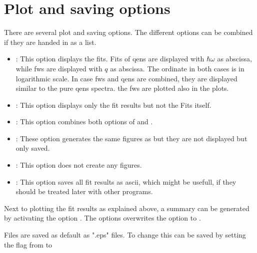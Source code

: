 \section{Plot and saving options}
There are several plot and saving options. The different options can be combined if they are handed in as a list.
\begin{itemize}
	\item {}: This option displays the fits. Fits of \Gls{qens} are displayed with $\hbar\omega$ as abscissa, while \gls{fws} are displayed with $q$ as abscissa. The ordinate in both cases is in logarithmic scale. In case \gls{fws} and \gls{qens} are combined, they are displayed similar to the pure \gls{qens} spectra. the \gls{fws} are plotted also in the plots. 
	\item {}: This option displays only the fit results but not the Fits itself.
	\item {}: This option combines both options of  and .
	\item {}: These option generates the same figures as  but they are not displayed but only saved.
	\item {}: This option does not create any figures.
	\item {}: This option saves all fit results as ascii, which might be usefull, if they should be treated later with other programs.
\end{itemize}
Next to plotting the fit results as explained above, a summary can be generated by activating the option . The options  overwrites the option  to .

Files are saved as default as ".eps" files. To change this can be saved by setting the flag  from  to 